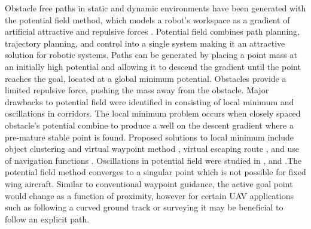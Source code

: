 \documentclass[conf]{new-aiaa}
\begin{document}
Obstacle free paths in static and dynamic environments have been generated with the potential field method, which models a robot's workspace as a gradient of artificial attractive and repulsive forces \cite{khatib_real-time_1986}. Potential field combines path planning, trajectory planning, and control \cite{rimon_exact_1992} into a single system making it an attractive solution for robotic systems. Paths can be generated by placing a point mass at an initially high potential and allowing it to descend the gradient until the point reaches the goal, located at a global minimum potential. Obstacles provide a limited repulsive force, pushing the mass away from the obstacle. Major drawbacks to potential field were identified in \cite{koren_potential_1991} consisting of local minimum and oscillations in corridors. The local minimum problem occurs when closely spaced obstacle's potential combine to produce a well on the descent gradient where a pre-mature stable point is found. Proposed solutions to local minimum include object clustering and virtual waypoint method \cite{liu_virtual-waypoint_2016}, virtual escaping route \cite{kim_escaping_2009}, and use of navigation functions \cite{goerzen_survey_2010}. Oscillations in potential field were studied in \cite{lei_tang_novel_2010}, and \cite{li_efficient_2012}.The potential field method converges to a singular point which is not possible for fixed wing aircraft. Similar to conventional waypoint guidance, the active goal point would change as a function of proximity, however for certain UAV applications such as following a curved ground track or surveying it may be beneficial to follow an explicit path. \\



%

 


%
%
\end{document}

